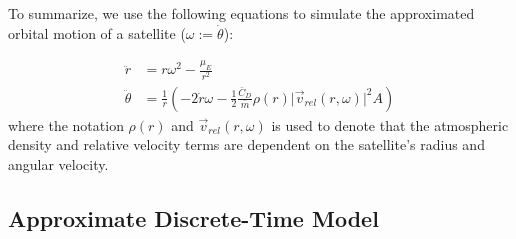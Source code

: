 \documentclass[letterpaper, 10 pt, conference]{ieeeconf}  %
\begin{document}
To summarize, we use the following equations to simulate the approximated orbital motion of a satellite ($\omega := \dot{\theta}$):
\iffalse
\begin{subequations}
\begin{align}
\ddot{r} &= r\omega^2 - \frac{\mu_{\scriptscriptstyle E}}{r^2} \\
\ddot{\theta} &= \frac{1}{r} \left( -2\dot{r}\omega-\frac{1}{2}\frac{C_D}{m}\rho r^2\left( \omega-\omega_{\scriptscriptstyle E}\text{cos}(\phi) \right)^2 A \right)
\end{align}
\end{subequations}
\fi
\begin{subequations}
\begin{align}
\ddot{r} &= r\omega^2 - \frac{\mu_{\scriptscriptstyle E}}{r^2} \\
\ddot{\theta} &= \frac{1}{r} \left( -2\dot{r}\omega-\frac{1}{2}\frac{\bar{C}_D}{\bar{m}}\rho(r) \lvert \vec{v}_{rel}(r, \omega) \rvert^2 A \right)
\end{align}
\end{subequations}
where the notation $\rho(r)$ and $\vec{v}_{rel}(r,\omega)$ is used to denote that the atmospheric density and relative velocity terms are dependent on the satellite's radius and angular velocity.

\subsection{Approximate Discrete-Time Model}
\end{document}
